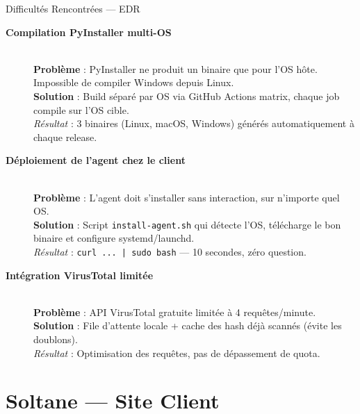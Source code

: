 \documentclass[xcolor=dvipsnames, aspectratio=169, 10pt]{beamer}
\begin{document}
\begin{frame}{Difficultés Rencontrées — EDR}
  \begin{description}
    \item[\textbf{Compilation PyInstaller multi-OS}] \hfill \\
      \textbf{Problème} : PyInstaller ne produit un binaire que pour l'OS hôte. Impossible de compiler Windows depuis Linux. \\
      \textbf{Solution} : Build séparé par OS via GitHub Actions matrix, chaque job compile sur l'OS cible. \\
      \textit{Résultat} : 3 binaires (Linux, macOS, Windows) générés automatiquement à chaque release.
    \item[\textbf{Déploiement de l'agent chez le client}] \hfill \\
      \textbf{Problème} : L'agent doit s'installer sans interaction, sur n'importe quel OS. \\
      \textbf{Solution} : Script \texttt{install-agent.sh} qui détecte l'OS, télécharge le bon binaire et configure systemd/launchd. \\
      \textit{Résultat} : \texttt{curl ... | sudo bash} — 10 secondes, zéro question.
    \item[\textbf{Intégration VirusTotal limitée}] \hfill \\
      \textbf{Problème} : API VirusTotal gratuite limitée à 4 requêtes/minute. \\
      \textbf{Solution} : File d'attente locale + cache des hash déjà scannés (évite les doublons). \\
      \textit{Résultat} : Optimisation des requêtes, pas de dépassement de quota.
  \end{description}
\end{frame}

\section{Soltane — Site Client}
\end{document}
